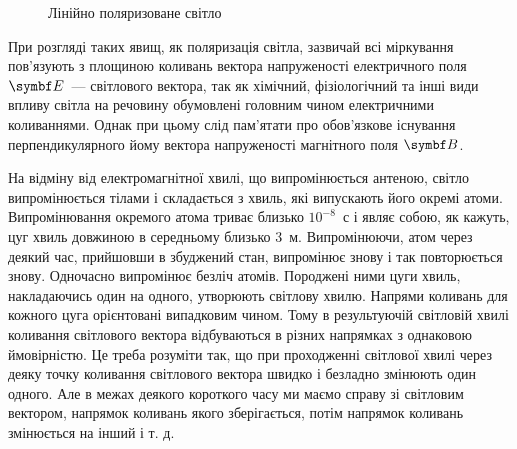 \begin{figure}[!h]
\begin{tikzpicture}[x=(-15:1.2), y=(90:1.0), z=(-150:1.0),
                    line cap=round, line join=round,
                    axis/.style={black, thick,->},
                    vector/.style={>=stealth,->}]
\end{tikzpicture}
\caption{Лінійно поляризоване світло}
\label{fig:linearPolarisation}
\end{figure}

При розгляді таких явищ, як поляризація світла, зазвичай всі міркування пов'язують з площиною коливань вектора напруженості електричного поля $\Efield$~--- світлового вектора, так як хімічний, фізіологічний та інші види впливу світла на речовину обумовлені головним чином електричними коливаннями. Однак при цьому слід пам'ятати про обов'язкове існування перпендикулярного йому вектора напруженості магнітного поля $\Bfield$.

На відміну від електромагнітної хвилі, що випромінюється антеною, світло випромінюється тілами і складається з хвиль, які випускають його окремі атоми. Випромінювання окремого атома триває близько $10^{-8}$~с і являє собою, як кажуть, цуг хвиль довжиною в середньому близько $3$~м. Випромінюючи, атом через деякий час, прийшовши в збуджений стан, випромінює знову і так повторюється знову. Одночасно випромінює безліч атомів. Породжені ними цуги хвиль, накладаючись один на одного, утворюють світлову хвилю. Напрями коливань для кожного цуга орієнтовані випадковим чином. Тому в результуючій світловій хвилі коливання світлового вектора відбуваються в різних напрямках з однаковою ймовірністю. Це треба розуміти так, що при проходженні світлової хвилі через деяку точку коливання світлового вектора швидко і безладно змінюють один одного. Але в межах деякого короткого часу ми маємо справу зі світловим вектором, напрямок коливань якого зберігається, потім напрямок коливань змінюється на інший і т. д. 



